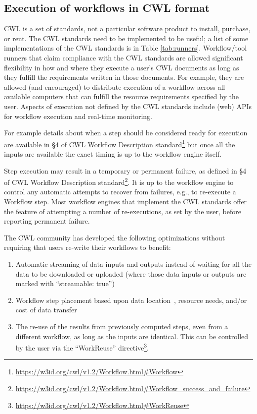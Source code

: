 {\subsection{Execution of workflows in CWL format} \label{sec:execution}
CWL is a set of standards, not a particular software product to install, purchase, or rent. The CWL standards need to be implemented to be useful; a list of some implementations of the CWL standards is in Table \ref{tab:runners}. Workflow/tool runners that claim compliance with the CWL standards are allowed significant flexibility in how and where they execute a user's CWL documents as long as they fulfill the requirements written in those documents. For example, they are allowed (and encouraged) to distribute execution of a workflow across all available computers that can fulfill the resource requirements specified by the user. Aspects of execution not defined by the CWL standards include (web) APIs for workflow execution and real-time monitoring.

For example details about when a step should be considered ready for execution are available in §4 of CWL Workflow Description standard\footnote{\url{https://w3id.org/cwl/v1.2/Workflow.html\#Workflow}} but once all the inputs are available the exact timing is up to the workflow engine itself. 

Step execution may result in a temporary or permanent failure, as defined in §4 of CWL Workflow Description standard\footnote{\url{https://w3id.org/cwl/v1.2/Workflow.html\#Workflow_success_and_failure}}. It is up to the workflow engine to control any automatic attempts to recover from failures, e.g., to re-execute a Workflow step. Most workflow engines that implement the CWL standards offer the feature of attempting a number of re-executions, as set by the user, before reporting permanent failure.

The CWL community has developed the following optimizations without requiring that users re-write their workflows to benefit:
\begin{enumerate}
\item Automatic streaming of data inputs and outputs instead of waiting for all the data to be downloaded or uploaded (where those data inputs or outputs are marked with ``streamable: true'')
\item Workflow step placement based upon data location~\cite{jiang_tr-19-01_2019}, resource needs, and/or cost of data transfer~\cite{jiang_pivot_2019}
\item The re-use of the results from previously computed steps, even from a different workflow, as long as the inputs are identical. This can be controlled by the user via the ``WorkReuse'' directive\footnote{\url{https://w3id.org/cwl/v1.2/Workflow.html\#WorkReuse}}.
\end{enumerate}

}
